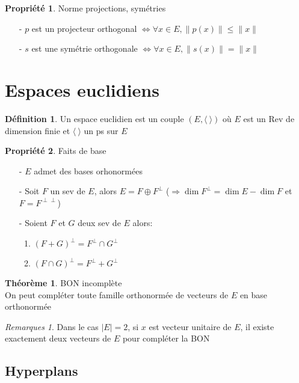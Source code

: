 \documentclass[fleqn]{article}
\theoremstyle{definition} \newtheorem*{defi}{D\'efinition}
\theoremstyle{definition} \newtheorem*{theo}{Th\'eor\`eme}
\theoremstyle{definition} \newtheorem*{coro}{Corollaire}
\theoremstyle{remark} \newtheorem*{rqs}{Remarques}
\theoremstyle{definition} \newtheorem*{prop}{Propri\'et\'e}
\begin{document}
\begin{prop} Norme projections, sym\'etries
	\begin{enumerate}
		\item [-] $p$ est un projecteur orthogonal $\Leftrightarrow \forall x \in E, \|p(x)\| \leq \|x\|$
		\item [-] $s$ est une sym\'etrie orthogonale $\Leftrightarrow \forall x \in E, \|s(x)\| = \|x\|$
	\end{enumerate}
\end{prop}


\section{Espaces euclidiens}

\begin{defi}
	Un espace euclidien est un couple $(E, \langle\  \rangle)$ o\`u $E$ est un Rev de dimension finie et $\langle\  \rangle$ un ps sur $E$
\end{defi}

\begin{prop} Faits de base
	\begin{enumerate}
		\item [-] $E$ admet des bases orhonorm\'ees
		\item [-] Soit $F$ un sev de $E$, alors $E = F \oplus F^\perp$ ($\Rightarrow \dim F^\perp = \dim E - \dim F$ et $F=F^{\perp \perp}$)
		\item [-] Soient $F$ et $G$ deux sev de $E$ alors:
			\begin{enumerate}
				\item $(F+G)^\perp = F^\perp \cap G^\perp$
				\item $(F\cap G)^\perp = F^\perp + G^\perp$
			\end{enumerate}
	\end{enumerate}
\end{prop}

\begin{theo} BON incompl\`ete\\
	On peut compl\'eter toute famille orthonorm\'ee de vecteurs de $E$ en base orthonorm\'ee
	\begin{rqs}
		Dans le cas $|E| = 2$, si $x$ est vecteur unitaire de $E$, il existe exactement deux vecteurs de $E$ pour compl\'eter la BON
	\end{rqs}
\end{theo}

\subsection{Hyperplans}
\end{document}
